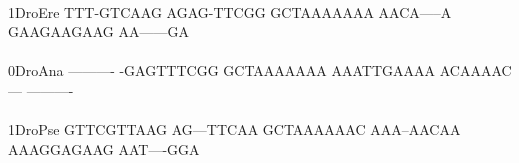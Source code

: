 \documentclass[11pt,twoside,reqno,a4paper]{article}
\begin{document}
{\hspace*{4\charwidth}\hspace*{7\charwidth}\hspace*{1\charwidth}\hspace*{1\charwidth}\hspace*{1\charwidth}\hspace*{1\charwidth}\hspace*{1\charwidth}\hspace*{1\charwidth}\\
1\hspace*{3\charwidth}DroEre	TTT-GTCAAG	AGAG-TTCGG	GCTAAAAAAA	AACA-----A	GAAGAAGAAG	AA------GA	\\
\hspace*{4\charwidth}\hspace*{7\charwidth}\hspace*{1\charwidth}\hspace*{1\charwidth}\hspace*{1\charwidth}\hspace*{1\charwidth}\hspace*{1\charwidth}\hspace*{1\charwidth}\\
0\hspace*{3\charwidth}DroAna	----------	-GAGTTTCGG	GCTAAAAAAA	AAATTGAAAA	ACAAAAC---	----------	\\
\hspace*{4\charwidth}\hspace*{7\charwidth}\hspace*{1\charwidth}\hspace*{1\charwidth}\hspace*{1\charwidth}\hspace*{1\charwidth}\hspace*{1\charwidth}\hspace*{1\charwidth}\\
1\hspace*{3\charwidth}DroPse	GTTCGTTAAG	AG---TTCAA	GCTAAAAAAC	AAA--AACAA	AAAGGAGAAG	AAT----GGA	\\
\hspace*{4\charwidth}\hspace*{7\charwidth}\hspace*{1\charwidth}\hspace*{1\charwidth}\hspace*{1\charwidth}\hspace*{1\charwidth}\hspace*{1\charwidth}\hspace*{1\charwidth}\\
}
\end{document}
